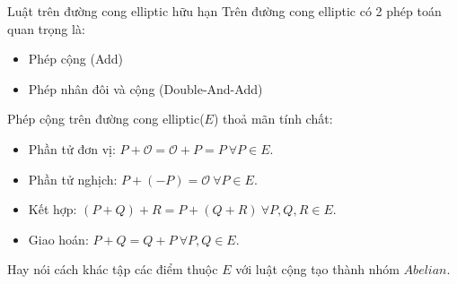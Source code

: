 \documentclass[compress]{beamer}
\begin{document}
\begin{frame}{Luật trên đường cong elliptic hữu hạn}
Trên đường cong elliptic có 2 phép toán quan trọng là:
\begin{itemize}
\item Phép cộng (Add)
\item Phép nhân đôi và cộng (Double-And-Add)
\end{itemize}
Phép cộng trên đường cong elliptic($E$) thoả mãn tính chất:
\begin{itemize}
\item Phần tử đơn vị: $P + \mathcal{O} = \mathcal{O} + P = P \ \forall P \in E$.
\item Phần tử nghịch: $P + (-P) = \mathcal{O} \ \forall P \in E$.
\item Kết hợp: $(P + Q) + R = P + (Q + R) \ \forall P,Q,R \in E$.
\item Giao hoán: $P + Q = Q + P \ \forall P,Q \in E$.
\end{itemize}
Hay nói cách khác tập các điểm thuộc $E$ với luật cộng tạo thành nhóm $Abelian$.
\end{frame}
\end{document}
